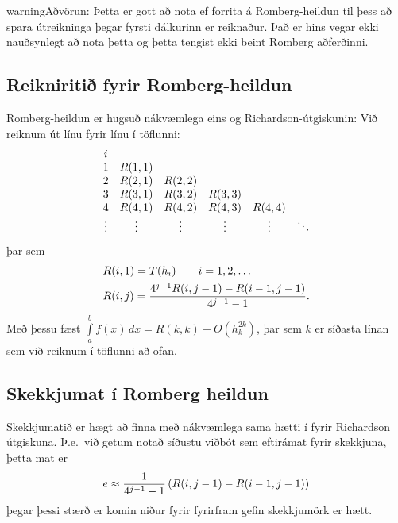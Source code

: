 \documentclass[letterpaper,10pt,icelandic]{sphinxmanual}
\begin{document}
\begin{notice}{warning}{Aðvörun:}
Þetta er gott að nota ef forrita á Romberg-heildun til þess að
spara útreikninga þegar fyrsti dálkurinn er reiknaður.
Það er hins vegar ekki nauðsynlegt að nota þetta og þetta tengist ekki
beint Romberg aðferðinni.
\end{notice}


\subsection{Reikniritið fyrir Romberg-heildun}
\label{kafli05:reikniriti-fyrir-romberg-heildun}
Romberg-heildun er hugsuð nákvæmlega eins og Richardson-útgiskunin: Við
reiknum út línu fyrir línu í töflunni:
\begin{gather}
\begin{split}\begin{array}{cccccc}
    i\\
    1 & R(1,1)\\
    2 & R(2,1) & R(2,2)\\
    3 & R(3,1) & R(3,2) & R(3,3)\\
    4 & R(4,1) & R(4,2) & R(4,3) & R(4,4)\\
    \vdots & \vdots & \vdots & \vdots & \vdots & \ddots
  \end{array}\end{split}\notag
\end{gather}
þar sem
\begin{gather}
\begin{split}\begin{aligned}
  &R(i,1) = T(h_i) \qquad i = 1,2,\ldots\\
  &R(i,j) = \frac{4^{j-1} R(i,j-1) - R(i-1,j-1)}{4^{j-1} - 1}.\end{aligned}\end{split}\notag
\end{gather}
Með þessu fæst
\(\int\limits_a^b f(x)\, dx = R(k,k) + O(h_k^{2k})\), þar sem
\(k\) er síðasta línan sem við reiknum í töflunni að ofan.


\subsection{Skekkjumat í Romberg heildun}
\label{kafli05:skekkjumat-i-romberg-heildun}
Skekkjumatið er hægt að finna með nákvæmlega sama hætti í fyrir
Richardson útgiskuna. Þ.e. við getum notað síðustu viðbót sem eftirámat
fyrir skekkjuna, þetta mat er
\begin{gather}
\begin{split}e \approx \frac{1}{4^{j-1}-1}\left( R(i,j-1) - R(i-1,j-1)\right)\end{split}\notag
\end{gather}
þegar þessi stærð er komin niður fyrir fyrirfram gefin skekkjumörk er
hætt.
\end{document}
